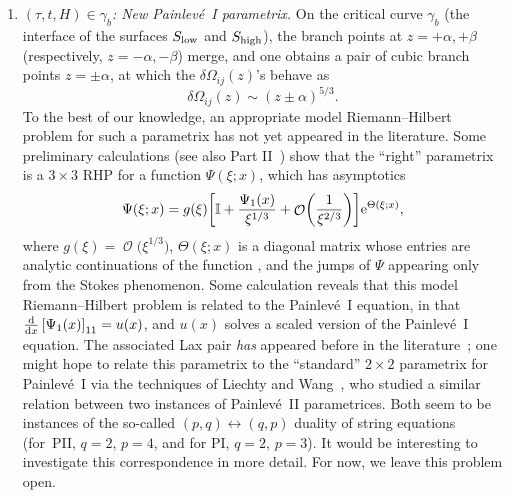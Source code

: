 \documentclass[pdftex]{sigma}
\DeclareMathOperator{\OO}{\mathcal{O}}
\numberwithin{equation}{section}
\begin{document}
\begin{Remark}
\begin{enumerate}
 \item[$(5)$] \textit{$(\tau,t,H)\in \gamma_b$: New Painlev\'{e}~I parametrix.}
 On the critical curve $\gamma_b$ (the interface of the surfaces $S_{{\rm low}}$ and $S_{{\rm high}}$), the branch points at $z=+\alpha,+\beta$
 (respectively, $z=-\alpha,-\beta$) merge, and one obtains a pair of cubic branch points $z=\pm \alpha$, at which the $\delta\Omega_{ij}(z)$'s
 behave as
 \begin{equation*}
 \delta \Omega_{ij}(z) \sim (z\pm \alpha)^{5/3}.
 \end{equation*}
 To the best of our knowledge, an appropriate model Riemann--Hilbert problem for such a parametrix has not yet appeared in the literature. Some
 preliminary calculations (see also Part II~\cite{DHL2}) show that the ``right'' parametrix is a $3\times 3$ RHP for a function $\Psi(\xi;x)$,
 which has asymptotics
 \begin{equation*}
 \Psi(\xi;x) = g(\xi)\biggl[\mathbb{I} + \frac{\Psi_{1}(x)}{\xi^{1/3}} + \OO\biggl(\frac{1}{\xi^{2/3}}\biggr)\biggr]{\rm e}^{\Theta(\xi;x)},
 \end{equation*}
 where $g(\xi) = \OO\bigl(\xi^{1/3}\bigr)$, $\Theta(\xi;x)$ is a diagonal matrix whose entries are analytic continuations of the function , and the jumps of $\Psi$ appearing only from the Stokes phenomenon. Some calculation reveals
 that this model Riemann--Hilbert problem is related to the Painlev\'{e}~I equation, in that $\frac{\rm d}{{\rm d}x}\left[\Psi_{1}(x)\right]_{11} = u(x)$, and $u(x)$ solves a scaled version of the Painlev\'{e}~I equation. The associated Lax pair \textit{has} appeared before in the literature~\cite{JKT}; one might hope to relate this parametrix to the ``standard'' $2\times 2$ parametrix for Painlev\'{e}~I via the
 techniques of Liechty and Wang~\cite{LW}, who studied a similar relation between two instances of Painlev\'{e}~II parametrices. Both
 seem to be instances of the so-called $(p,q)\leftrightarrow (q,p)$ duality of string equations~\cite{FKN,GGPZ} (for~PII, $q=2$, $p=4$, and for PI, $q=2$, $p=3$).
 It would be interesting to investigate this correspondence in more detail. For now, we leave this problem open.


\end{enumerate}
\end{Remark}
\end{document}

